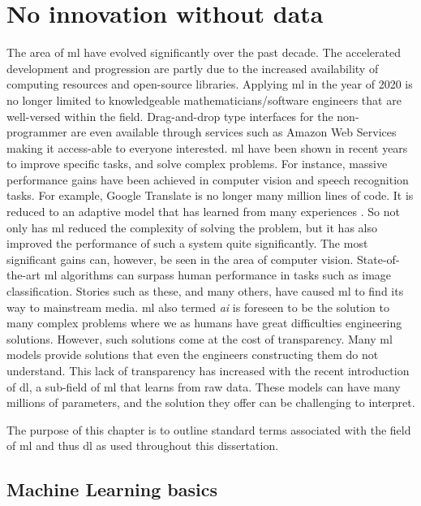 \chapter{No innovation without data}\label{ch:mlbasics}

The area of \gls{ml} have evolved significantly over the past decade. The accelerated development and progression are partly due to the increased availability of computing resources and open-source libraries. Applying \gls{ml} in the year of 2020 is no longer limited to knowledgeable mathematicians/software engineers that are well-versed within the field. Drag-and-drop type interfaces for the non-programmer are even available through services such as Amazon Web Services making it access-able to everyone interested. \gls{ml} have been shown in recent years to improve specific tasks, and solve complex problems. For instance, massive performance gains have been achieved in computer vision and speech recognition tasks. For example, Google Translate is no longer many million lines of code. It is reduced to an adaptive model that has learned from many experiences \cite{Wu2016GooglesTranslation}. So not only has \gls{ml} reduced the complexity of solving the problem, but it has also improved the performance of such a system quite significantly. The most significant gains can, however, be seen in the area of computer vision. State-of-the-art \gls{ml} algorithms can surpass human performance in tasks such as image classification. Stories such as these, and many others, have caused \gls{ml} to find its way to mainstream media. \gls{ml} also termed \emph{\gls{ai}} is foreseen to be the solution to many complex problems where we as humans have great difficulties engineering solutions. However, such solutions come at the cost of transparency. Many \gls{ml} models provide solutions that even the engineers constructing them do not understand. This lack of transparency has increased with the recent introduction of \gls{dl}, a sub-field of \gls{ml} that learns from raw data. These models can have many millions of parameters, and the solution they offer can be challenging to interpret. 

The purpose of this chapter is to outline standard terms associated with the field of \gls{ml} and thus \gls{dl} as used throughout this dissertation.



\section{Machine Learning basics}


